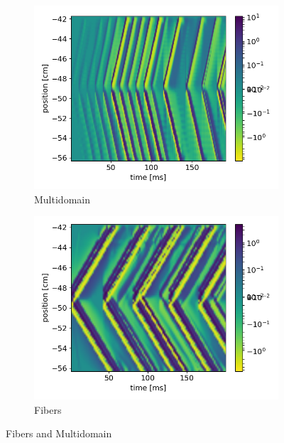 \begin{figure}[H]
  \centering%
  \begin{subfigure}[t]{0.48\textwidth}%
    \centering%
    \includegraphics[width=\textwidth]{images/results/application/2_multidomain.png}%
    \caption{Multidomain}%
    \label{fig:2_multidomain}%
  \end{subfigure}
  \quad
  \begin{subfigure}[t]{0.48\textwidth}%
    \centering%
    \includegraphics[width=\textwidth]{images/results/application/2_fibers.png}%
    \caption{Fibers}%
    \label{fig:2_fibers}%
  \end{subfigure}   
  \caption{Fibers and Multidomain}%
  \label{fig:multidomain_fibers}%
\end{figure}%


